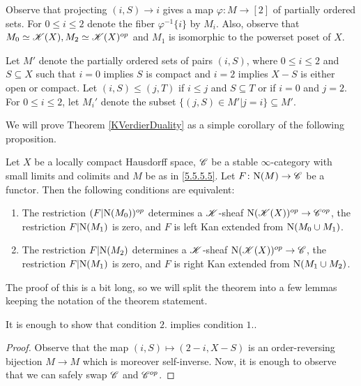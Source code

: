 \documentclass[../../thesis.tex]{subfiles}
\begin{document}
\begin{remark}[{\cite[Remark 5.5.5.6]{HA}}]
    Observe that projecting $(i,S) \to i$ gives a map $\varphi: M \to [2]$ of partially ordered sets.
    For $0 \leq i \leq 2$ denote the fiber $\varphi^{-1}\{i\}$ by $M_i$.
    Also, observe that $M_0 \simeq \mathscr{K}(X), M_2\simeq \mathscr{K}(X)^{op}$ and $M_1$ is isomorphic to the powerset poset of $X$.
\end{remark}
\begin{definition}
    Let $M'$ denote the partially ordered sets of pairs $(i,S)$, where $0 \leq i \leq 2$ and $S \subseteq X$ such that $i=0$ implies $S$ is compact and $i=2$ implies $X-S$ is either open or compact.
    Let $(i, S) \leq (j,T)$ if $i\leq j$ and $S\subseteq T$ or if $i=0$ and $j=2$.
    For $0 \leq i \leq 2$, let $M_i'$ denote the subset $\{(j,S) \in M' | j=i\} \subseteq M'$.
\end{definition}
We will prove Theorem \ref{KVerdierDuality} as a simple corollary of the following proposition.
\begin{proposition}[{\cite[Proposition 5.5.5.7]{HA}}]\label{5.5.5.7}
    Let $X$ be a locally compact Hausdorff space, $\mathscr{C}$ be a stable $\infty$-category with small limits and colimits and $M$ be as in \ref{5.5.5.5}.
    Let $F \colon \mathrm{N}(M) \to \mathscr{C}$ be a functor.
    Then the following conditions are equivalent:
    \begin{enumerate}
        \item The restriction $(F|\mathrm{N}(M_0))^{op}$ determines a $\mathscr{K}$-sheaf $\mathrm{N}(\mathscr{K}(X))^{op} \to \mathscr{C}^{op}$, the restriction $F|\mathrm{N}(M_1)$ is zero, and $F$ is left Kan extended from $\mathrm{N}(M_0 \cup M_1)$.
        \item The restriction $F|\mathrm{N}(M_2)$ determines a $\mathscr{K}$-sheaf $\mathrm{N}(\mathscr{K}(X))^{op} \to \mathscr{C}$, the restriction $F|\mathrm{N}(M_1)$ is zero, and $F$ is right Kan extended from $\mathrm{N}(M_1 \cup M_2)$.
    \end{enumerate}
\end{proposition}
The proof of this is a bit long, so we will split the theorem into a few lemmas keeping the notation of the theorem statement.
\begin{lemma}
    It is enough to show that condition $2.$ implies condition $1.$.
\end{lemma}
\begin{proof}
    Observe that the map $(i,S) \mapsto (2-i, X-S)$ is an order-reversing bijection $M\to M$ which is moreover self-inverse.
    Now, it is enough to observe that we can safely swap $\mathscr{C}$ and $\mathscr{C}^{op}$.
\end{proof}
\end{document}
